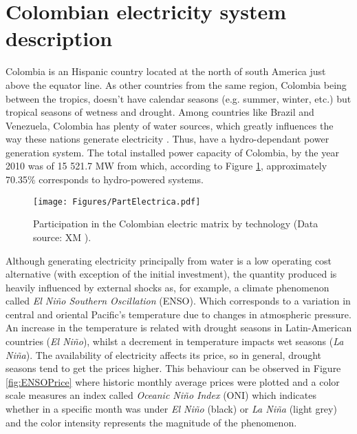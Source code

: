 \documentclass[3p]{elsarticle}
\begin{document}
\section{Colombian electricity system description}\label{ch:ElecSys}
Colombia is an Hispanic country located at the north of south America just above the equator line. As other countries from the same region, Colombia being between the tropics, doesn't have calendar seasons (e.g. summer, winter, etc.) but tropical seasons of wetness and drought. Among countries like Brazil and Venezuela, Colombia has plenty of water sources, which greatly influences the way these nations generate electricity \citep{CREG2006}. Thus, have a hydro-dependant power generation system. The total installed power capacity of Colombia, by the year 2010 was of 15 521.7 MW \cite{UPME2015} from which, according to Figure \ref{fig:PartElec}, approximately 70.35\% corresponds to hydro-powered systems. 

\begin{figure}[!h]
\center
\texttt{[image: Figures/PartElectrica.pdf]}
\caption{Participation in the Colombian electric matrix by technology (Data source: XM \cite{XM}).}
\label{fig:PartElec}
\end{figure}

Although generating electricity principally from water is a low operating cost alternative (with exception of the initial investment), the quantity produced is heavily influenced by external shocks as, for example, a climate phenomenon called \emph{El Ni\~no Southern Oscillation} (ENSO). Which corresponds to a variation in central and oriental Pacific's temperature due to changes in atmospheric pressure. An increase in the temperature is related with drought seasons in Latin-American countries (\emph{El Ni\~no}), whilst a decrement in temperature impacts wet seasons (\emph{La Ni\~na}). The availability of electricity affects its price, so in general, drought seasons tend to get the prices higher. This behaviour can be observed in Figure \ref{fig:ENSOPrice} where historic monthly average prices were plotted and a color scale measures an index called \emph{Oceanic Ni\~no Index} (ONI) \citep{InternationalResearchInstituteforClimateandSociety} which indicates whether in a specific month was under \emph{El Ni\~no} (black) or \emph{La Ni\~na} (light grey) and the color intensity represents the magnitude of the phenomenon.%
\end{document}
